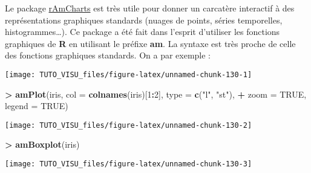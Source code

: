 \documentclass[]{book}
\newenvironment{Shaded}{\begin{snugshade}}{\end{snugshade}}
\newcommand{\DataTypeTok}[1]{\textcolor[rgb]{0.13,0.29,0.53}{#1}}
\newcommand{\DecValTok}[1]{\textcolor[rgb]{0.00,0.00,0.81}{#1}}
\newcommand{\KeywordTok}[1]{\textcolor[rgb]{0.13,0.29,0.53}{\textbf{#1}}}
\newcommand{\NormalTok}[1]{#1}
\newcommand{\OperatorTok}[1]{\textcolor[rgb]{0.81,0.36,0.00}{\textbf{#1}}}
\newcommand{\OtherTok}[1]{\textcolor[rgb]{0.56,0.35,0.01}{#1}}
\newcommand{\StringTok}[1]{\textcolor[rgb]{0.31,0.60,0.02}{#1}}
\theoremstyle{definition}
\theoremstyle{definition}
\theoremstyle{definition}
\theoremstyle{remark}
\begin{document}
Le package \href{https://datastorm-open.github.io/introduction_ramcharts/}{rAmCharts} est très utile pour donner un carcatère interactif à des représentations graphiques standards (nuages de points, séries temporelles, histogrammes\ldots{}). Ce package a été fait dans l'esprit d'utiliser les fonctions graphiques de \textbf{R} en utilisant le préfixe \textbf{am}. La syntaxe est très proche de celle des fonctions graphiques standards. On a par exemple :

\begin{Shaded}
\end{Shaded}

\begin{center}\texttt{[image: TUTO\_VISU\_files/figure-latex/unnamed-chunk-130-1]} \end{center}

\begin{Shaded}
\begin{Highlighting}[]
\OperatorTok{>}\StringTok{ }\KeywordTok{amPlot}\NormalTok{(iris, }\DataTypeTok{col =} \KeywordTok{colnames}\NormalTok{(iris)[}\DecValTok{1}\OperatorTok{:}\DecValTok{2}\NormalTok{], }\DataTypeTok{type =} \KeywordTok{c}\NormalTok{(}\StringTok{"l"}\NormalTok{, }\StringTok{"st"}\NormalTok{), }
\OperatorTok{+}\StringTok{        }\DataTypeTok{zoom =} \OtherTok{TRUE}\NormalTok{, }\DataTypeTok{legend =} \OtherTok{TRUE}\NormalTok{)}
\end{Highlighting}
\end{Shaded}

\begin{center}\texttt{[image: TUTO\_VISU\_files/figure-latex/unnamed-chunk-130-2]} \end{center}

\begin{Shaded}
\begin{Highlighting}[]
\OperatorTok{>}\StringTok{ }\KeywordTok{amBoxplot}\NormalTok{(iris)}
\end{Highlighting}
\end{Shaded}

\begin{center}\texttt{[image: TUTO\_VISU\_files/figure-latex/unnamed-chunk-130-3]} \end{center}
\end{document}

